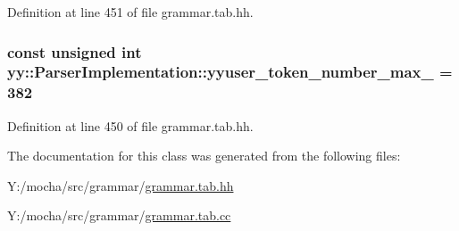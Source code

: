 Definition at line 451 of file grammar.tab.hh.

\hypertarget{classyy_1_1_parser_implementation_a757e1d8437b95246c3184f629a57c0f9}{
\subsubsection[{yyuser\_\-token\_\-number\_\-max\_\-}]{\setlength{\rightskip}{0pt plus 5cm}const unsigned int {\bf yy::ParserImplementation::yyuser\_\-token\_\-number\_\-max\_\-} = 382}}
\label{classyy_1_1_parser_implementation_a757e1d8437b95246c3184f629a57c0f9}


Definition at line 450 of file grammar.tab.hh.



The documentation for this class was generated from the following files:\begin{DoxyCompactItemize}
\item 
Y:/mocha/src/grammar/\hyperlink{grammar_8tab_8hh}{grammar.tab.hh}\item 
Y:/mocha/src/grammar/\hyperlink{grammar_8tab_8cc}{grammar.tab.cc}\end{DoxyCompactItemize}
